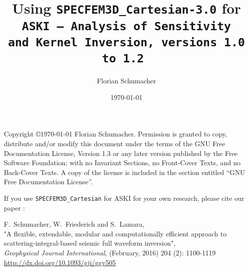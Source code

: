 \documentclass[12pt,a4paper]{article}
\newcommand{\lcode}[1]{\nolinkurl{#1}}
\newcommand{\ASKI}{ {\ttfamily ASKI} }
\begin{document}
\sloppy
%
\setlength{\parindent}{0cm}
\addtolength{\parskip}{0.5em}
%
%
%
\title{Using {\tt \Huge SPECFEM3D\_Cartesian-3.0} for \\ \tt {\Huge ASKI} {\rm--} {\Huge A}{\large nalysis of} {\Huge S}{\large ensitivity \\ and} {\Huge\tt K}{\large ernel} {\Huge\tt I}{\large nversion, versions 1.0 to 1.2} }
\author[1]{Florian Schumacher}
\date{\mydate \today}
\maketitle
%
Copyright \copyright {\myyear \today} Florian Schumacher.
Permission is granted to copy, distribute and/or modify this document
under the terms of the GNU Free Documentation License, Version 1.3
or any later version published by the Free Software Foundation;
with no Invariant Sections, no Front-Cover Texts, and no Back-Cover Texts.
A copy of the license is included in the section entitled ``GNU
Free Documentation License''.

\vspace{0.7cm}

If you use \lcode{SPECFEM3D_Cartesian} for \ASKI{} for your own research, please cite our paper \cite{Schumacher16}:

F.\ Schumacher, W.\ Friederich and S.\ Lamara, \\
"A flexible, extendable, modular and 
computationally efficient approach to scattering-integral-based seismic full waveform 
inversion", \\
\emph{Geophysical Journal International}, (February, 2016) 204 (2): 1100-1119\\
\url{http://dx.doi.org/10.1093/gji/ggv505}
\end{document}
